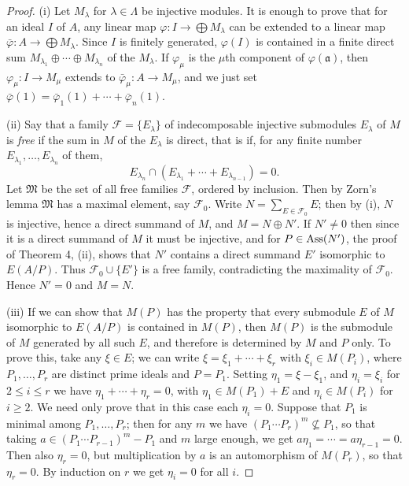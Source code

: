 \begin{proof}
(i) Let $M_\lambda$ for $\lambda \in \Lambda$ be injective modules. It is enough to prove that
for an ideal $I$ of $A$, any linear map $\varphi\colon I \to \bigoplus M_\lambda$ can be extended to a linear
map $\bar{\varphi}\colon A \to \bigoplus M_\lambda$. Since $I$ is finitely generated, $\varphi(I)$ is contained
in a finite direct sum $M_{\lambda_1} \oplus \cdots \oplus M_{\lambda_n}$ of the $M_\lambda$. If $\varphi_\mu$ is the $\mu$th component
of $\varphi(\mathfrak{a})$, then $\varphi_\mu\colon I \to M_\mu$ extends
to $\bar{\varphi}_\mu\colon A \to M_\mu$, and we just set $\bar{\varphi}(1) = \bar{\varphi}_1(1) + \cdots + \bar{\varphi}_n(1)$.

(ii) Say that a family $\mathcal{F} = \{E_\lambda\}$ of indecomposable injective submodules
$E_\lambda$ of $M$ is \emph{free} if the sum in $M$ of the $E_\lambda$ is direct, that is if, for any finite
number $E_{\lambda_1}, \ldots, E_{\lambda_n}$ of them,
\[
  E_{\lambda_n} \cap (E_{\lambda_1} + \cdots + E_{\lambda_{n-1}}) = 0.
\]
Let $\mathfrak{M}$ be the set of all free families $\mathcal{F}$, ordered by inclusion. Then by
Zorn's lemma $\mathfrak{M}$ has a maximal element, say $\mathcal{F}_0$. Write $N = \sum_{E \in \mathcal{F}_0} E$; then
by (i), $N$ is injective, hence a direct summand of $M$, and $M = N \oplus N'$. If
$N' \neq 0$ then since it is a direct summand of $M$ it must be injective, and
for $P \in \operatorname{Ass}(N')$, the proof of Theorem 4, (ii), shows that $N'$ contains a
direct summand $E'$ isomorphic to $E(A/P)$. Thus $\mathcal{F}_0 \cup \{E'\}$ is a free family,
contradicting the maximality of $\mathcal{F}_0$. Hence $N' = 0$ and $M = N$.

(iii) If we can show that $M(P)$ has the property that every submodule
$E$ of $M$ isomorphic to $E(A/P)$ is contained in $M(P)$, then $M(P)$ is the
submodule of $M$ generated by all such $E$, and therefore is determined by
$M$ and $P$ only. To prove this, take any $\xi \in E$; we can write $\xi = \xi_1 + \cdots +
\xi_r$ with $\xi_i \in M(P_i)$, where $P_1, \ldots, P_r$ are distinct prime ideals and $P = P_1$.
Setting $\eta_1 = \xi - \xi_1$, and $\eta_i = \xi_i$ for $2 \le i \le r$ we have $\eta_1 + \cdots + \eta_r = 0$, with
$\eta_1 \in M(P_1) + E$ and $\eta_i \in M(P_i)$ for $i \ge 2$. We need only prove that in this case
each $\eta_i = 0$. Suppose that $P_1$ is minimal among $P_1, \ldots, P_r$; then for any $m$
we have $(P_1 \cdots P_r)^m \nsubseteq P_1$, so that taking $a \in (P_1 \cdots P_{r-1})^m - P_1$ and $m$
large enough, we get $a\eta_1 = \cdots = a\eta_{r-1} = 0$. Then also $\eta_r = 0$, but
multiplication by $a$ is an automorphism of $M(P_r)$, so that $\eta_r = 0$. By
induction on $r$ we get $\eta_i = 0$ for all $i$.


\end{proof}
